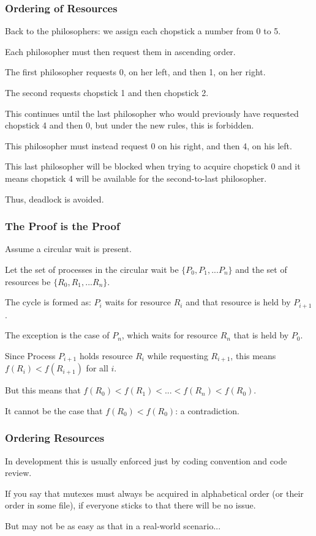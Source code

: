 \begin{frame}
\frametitle{Ordering of Resources}

Back to the philosophers: we assign each chopstick a number from 0 to 5. 

Each philosopher must then request them in ascending order. 

The first philosopher requests 0, on her left, and then 1, on her right. 

The second requests chopstick 1 and then chopstick 2. 

This continues until the last philosopher who would previously have requested chopstick 4 and then 0, but under the new rules, this is forbidden. 

This philosopher must instead request 0 on his right, and then 4, on his left. 

This last philosopher will be blocked when trying to acquire chopstick 0 and it means chopstick 4 will be available for the second-to-last philosopher. 

Thus, deadlock is avoided.

\end{frame}

\begin{frame}
\frametitle{The Proof is the Proof}

Assume a circular wait is present. 

Let the set of processes in the circular wait be $\{P_{0}, P_{1}, ... P_{n}\}$ and the set of resources be $\{R_{0}, R_{1}, ... R_{n}\}$. 

The cycle is formed as: $P_{i}$ waits for resource $R_{i}$ and that resource is held by $P_{i+1}$. 

The exception is the case of $P_{n}$, which waits for resource $R_{n}$ that is held by $P_{0}$.

Since Process $P_{i+1}$ holds resource $R_{i}$ while requesting $R_{i+1}$, this means $f(R_{i}) < f(R_{i+1})$ for all $i$. 

But this means that $f(R_{0}) < f(R_{1}) < ... < f(R_{n}) < f(R_{0})$. 

It cannot be the case that $f(R_{0}) < f(R_{0})$: a contradiction.

\end{frame}

\begin{frame}
\frametitle{Ordering Resources}

In development this is usually enforced just by coding convention and code review. 

If you say that mutexes must always be acquired in alphabetical order (or their order in some file), if everyone sticks to that there will be no issue.

But may not be as easy as that in a real-world scenario...

\end{frame}

